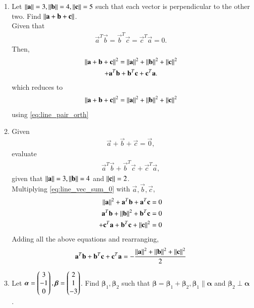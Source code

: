 \begin{enumerate}[label=\arabic*.,ref=\thesubsection.\theenumi]
\item Let $\left\lVert\mathbf{a}\right\rVert = 3, \left\lVert\mathbf{b}\right\rVert= 4, \left\lVert\mathbf{c}\right\rVert = 5$ such that each vector is perpendicular to the other two.  Find $\left\lVert\mathbf{a}+\mathbf{b}+\mathbf{c}\right\rVert$.
%
\\
\solution Given that 
%
\begin{align}
\label{eq:line_pair_orth}
 \vec{a}^T \vec{b} =  \vec{b}^T\vec{c}= \vec{c}^T\vec{a} = 0.
\end{align}
%
Then, 
%
\begin{multline}
\left\lVert\mathbf{a}+\mathbf{b}+\mathbf{c}\right\rVert^2 = \left\lVert\mathbf{a}\right\rVert^2+\left\lVert\mathbf{b}\right\rVert^2+\left\lVert\mathbf{c}\right\rVert^2
\\
+ \mathbf{a}^T \mathbf{b} +  \mathbf{b}^T\mathbf{c}+ \mathbf{c}^T\mathbf{a}.
\end{multline}
%
which reduces to 
%
\begin{align}
\left\lVert\mathbf{a}+\mathbf{b}+\mathbf{c}\right\rVert^2 = \left\lVert\mathbf{a}\right\rVert^2+\left\lVert\mathbf{b}\right\rVert^2+\left\lVert\mathbf{c}\right\rVert^2
\end{align}
%
using \eqref{eq:line_pair_orth}
%
\item Given 
\begin{align}
\label{eq:line_vec_sum_0}
 \vec{a}+\vec{b}+\vec{c} = \vec{0}, 
\end{align}
evaluate 
\begin{align}
 \vec{a}^T\vec{b}+\vec{b}^T\vec{c}+\vec{c}^T\vec{a},
\end{align}
given that $\left\lVert \mathbf{a}\right\rVert=3, \left\lVert \mathbf{b}\right\rVert= 4$ and $\left\lVert \mathbf{c}\right\rVert = 2 $.
%
\\
\solution Multiplying \eqref{eq:line_vec_sum_0} with $\vec{a}, \vec{b}, \vec{c}$,
\begin{align}
\left\lVert \mathbf{a}\right\rVert^2+\mathbf{a}^T\mathbf{b}+\mathbf{a}^T\mathbf{c} &= 0
\\
\mathbf{a}^T\mathbf{b}+\left\lVert \mathbf{b}\right\rVert^2+\mathbf{b}^T\mathbf{c} &= 0
\\
+\mathbf{c}^T\mathbf{a}+\mathbf{b}^T\mathbf{c}+\left\lVert \mathbf{c}\right\rVert^2 &= 0
\end{align}
%
Adding all the above equations and rearranging,
\begin{multline}
 \mathbf{a}^T\mathbf{b}+\mathbf{b}^T\mathbf{c}+\mathbf{c}^T\mathbf{a} = -\frac{\left\lVert \mathbf{a}\right\rVert^2+\left\lVert \mathbf{b}\right\rVert^2+\left\lVert \mathbf{c}\right\rVert^2}{2}
\end{multline}
%
\item Let $\bm{\alpha} = \begin{pmatrix}3\\-1\\0\end{pmatrix}, \bm{\beta} = \begin{pmatrix}2\\1\\-3\end{pmatrix}$.  Find $\bm{\beta}_1, \bm{\beta}_2 $ such that $\bm{\beta}=\bm{\beta}_1+\bm{\beta}_2, \bm{\beta}_1 \parallel  \bm{\alpha} $ and $\bm{\beta}_2 \perp \bm{\alpha} $.

\end{enumerate}
